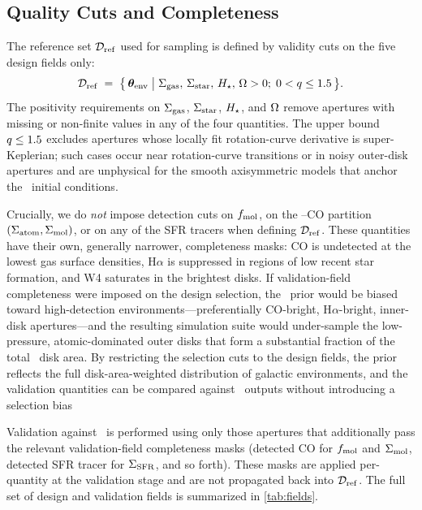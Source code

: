 \subsection{Quality Cuts and Completeness}
\label{sec:quality_cuts}

The reference set $\mathcal{D}_{\rm ref}$ used for sampling is defined by validity cuts
on the five design fields only:
\begin{equation}
  \mathcal{D}_{\rm ref} \;=\; \bigl\{\, \boldsymbol{\theta}_{\rm env} \;\big|\;
              \Sigma_{\rm gas},\, \Sigma_{\rm star},\, H_\star,\, \Omega > 0;\;
              0 < q \leq 1.5 \,\bigr\}.
  \label{eq:dref}
\end{equation}
The positivity requirements on $\Sigma_{\rm gas}$, $\Sigma_{\rm star}$, $H_\star$, and $\Omega$
remove apertures with missing or non-finite values in any of the four
quantities. The upper bound $q \leq 1.5$ excludes apertures whose
locally fit rotation-curve derivative is super-Keplerian; such cases occur
near rotation-curve transitions or in noisy outer-disk apertures and are
unphysical for the smooth axisymmetric models that anchor the
\TIGRESS\ initial conditions.

Crucially, we do \emph{not} impose detection cuts on $f_{\rm mol}$, on the
\HI--CO partition $(\Sigma_{\rm atom},\Sigma_{\rm mol})$, or on any of the SFR tracers when
defining $\mathcal{D}_{\rm ref}$. These quantities have their own, generally narrower,
completeness masks: CO is undetected at the lowest gas surface densities,
H$\alpha$ is suppressed in regions of low recent star formation, and W4
saturates in the brightest disks. If validation-field completeness were
imposed on the design selection, the \PHANGS\ prior would be biased toward
high-detection environments---preferentially CO-bright, H$\alpha$-bright,
inner-disk apertures---and the resulting simulation suite would
under-sample the low-pressure, atomic-dominated outer disks that form a
substantial fraction of the total \PHANGS\ disk area. By restricting the
selection cuts to the design fields, the prior reflects the full
disk-area-weighted distribution of galactic environments, and the
validation quantities can be compared against \TIGRESS\ outputs without
introducing a selection bias 

Validation against \PHANGS\ is performed using only those apertures that
additionally pass the relevant validation-field completeness masks
(detected CO for $f_{\rm mol}$ and $\Sigma_{\rm mol}$, detected SFR tracer for $\Sigma_{\rm SFR}$,
and so forth). These masks are applied per-quantity at the validation
stage and are not propagated back into $\mathcal{D}_{\rm ref}$. The full set of design
and validation fields is summarized in \autoref{tab:fields}.

